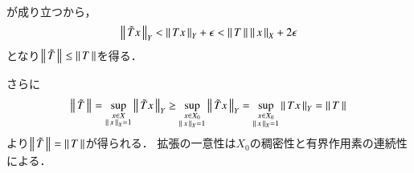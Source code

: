 \begin{prf}
\begin{description}
\begin{align}
				\end{align}
				が成り立つから，
				\begin{align}
					\left\|\, \tilde{T}x\, \right\|_{Y} < \left\|\, Tx\, \right\|_{Y} + \epsilon < \left\|\, T\, \right\|_{} \left\|\, x\, \right\|_{X} + 2\epsilon
				\end{align}
				となり$\left\|\, \tilde{T}\, \right\|_{} \leq \left\|\, T\, \right\|_{}$を得る．
		\end{description}
		さらに
		\begin{align}
			\left\|\, \tilde{T}\, \right\|_{} = \operatorname*{sup}_{\substack{x \in X \\ \left\|\, x\, \right\|_{X} = 1}} \left\|\, \tilde{T}x\, \right\|_{Y} 
			\geq \operatorname*{sup}_{\substack{x \in X_0 \\ \left\|\, x\, \right\|_{X} = 1}} \left\|\, \tilde{T}x\, \right\|_{Y} 
			= \operatorname*{sup}_{\substack{x \in X_0 \\ \left\|\, x\, \right\|_{X} = 1}} \left\|\, Tx\, \right\|_{Y} = \left\|\, T\, \right\|_{}
		\end{align}
		より$\left\|\, \tilde{T}\, \right\|_{} = \left\|\, T\, \right\|_{}$が得られる．
		拡張の一意性は$X_0$の稠密性と有界作用素の連続性による．
		\QED
\end{prf}

